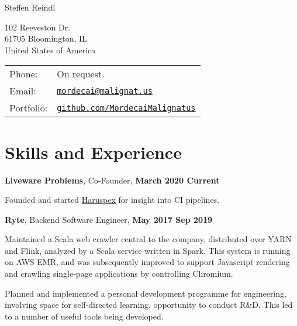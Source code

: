 \documentclass[a4paper]{article}
\def\name{Steffen Reindl}
\renewenvironment{itemize}{
  \begin{list}{}{
      \setlength{\leftmargin}{1.5em}
      \setlength{\itemsep}{10pt}
  }
}{
  \end{list}
}
\begin{document}
{\huge \name}
\vspace{0.25in}

\begin{minipage}{0.45\linewidth}
  102 Reeveston Dr.\\
  61705 Bloomington, IL\\
  United States of America
\end{minipage}
\begin{minipage}{0.45\linewidth}
  \begin{tabular}{ll}
    Phone: & On request. \\
    Email: & \href{mailto:mordecai@malignat.us}{\tt mordecai@malignat.us} \\
    Portfolio: & \href{https://github.com/MordecaiMalignatus/}{\tt github.com/MordecaiMalignatus}
  \end{tabular}
\end{minipage}

\section*{Skills and Experience}

\begin{itemize}
\item \textbf{Liveware Problems}, Co-Founder, \textbf{March 2020 {\textendash} Current}
  \begin{itemize}
    \item Founded and started \href{https://haruspex.dev}{Haruspex} for insight
     into CI pipelines.
  \end{itemize}
\item \textbf{Ryte}, Backend Software Engineer, \textbf{May 2017 {\textendash} Sep 2019}
        \begin{itemize}
            \item Maintained a Scala web crawler central to the company,
              distributed over YARN and Flink, analyzed by a Scala service
              written in Spark. This system is running on AWS EMR, and was
              subsequently improved to support Javascript rendering and crawling
              single-page applications by controlling Chromium.
            \item Planned and implemented a personal development programme for
              engineering, involving space for self-directed learning,
              opportunity to conduct R\&D. This led to a number of useful tools
              being developed.
        \end{itemize}
\end{itemize}
\end{document}
